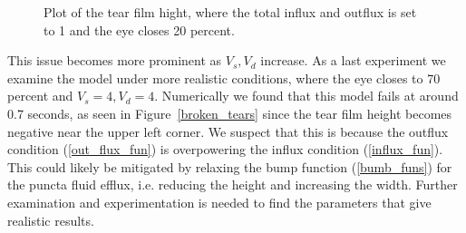 \begin{figure}
	\caption{Plot of the tear film hight, where the total influx and outflux is set to 1 and the eye closes 20 percent.}
	\label{tears_02}
\end{figure}

This issue becomes more prominent as $V_s,V_d$ increase. As a last experiment we examine the model under more realistic conditions, where the eye closes to 70 percent and $V_s=4,V_d=4$. Numerically we found that this model fails at around 0.7 seconds, as seen in Figure~\ref{broken_tears} since the tear film height becomes negative near the upper left corner. We suspect that this is because the outflux condition (\ref{out_flux_fun}) is overpowering the influx condition (\ref{influx_fun}). This could likely be mitigated by relaxing the bump function (\ref{bumb_funs}) for the puncta fluid efflux, i.e. reducing the height and increasing the width. Further examination and experimentation is needed to find the parameters that give realistic results.

